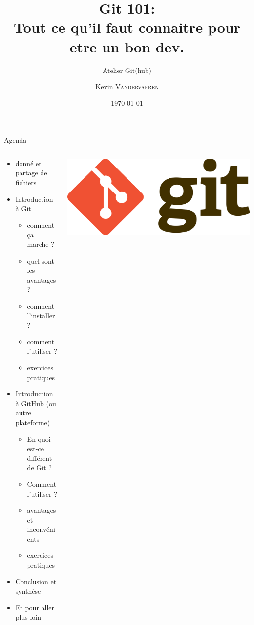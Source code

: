 \documentclass[usenames,dvipsnames]{beamer}
\title{Git 101:\\ Tout ce qu'il faut connaitre pour etre un bon dev.}
\subtitle{Atelier Git(hub)}
\date{\today}
\author{Kevin \textsc{Vandervaeren}}
\institute{ULB -- URLAB}
\begin{document}
\begin{frame}
	\titlepage
\end{frame}

\begin{frame}{Agenda}
	\begin{columns}
		\begin{column}{0.65\linewidth}
			\begin{itemize}
				\item<1-> donné et partage de fichiers 
				\item<2-> Introduction à Git
				\begin{itemize}
					\item comment ça marche ?
					\item quel sont les avantages ?
					\item comment l'installer ?
					\item comment l'utiliser ?
					\item exercices pratiques
				\end{itemize}
				\item<3-> Introduction à GitHub (ou autre plateforme)
				\begin{itemize}
					\item En quoi est-ce différent de Git ?
					\item Comment l'utiliser ?
					\item avantages et inconvénients
					\item exercices pratiques
				\end{itemize}
				\item<4-> Conclusion et synthèse
				\item<5-> Et pour aller plus loin
			\end{itemize}
		\end{column} %
		\begin{column}{0.3\linewidth}
			\includegraphics[width=\linewidth]{Im/Git-logo.png}
		\end{column}
	\end{columns}
\end{frame}
\end{document}
